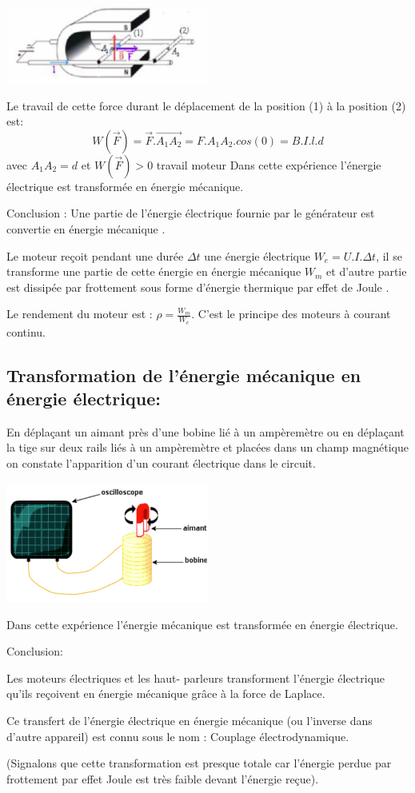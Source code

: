 \documentclass[12pt]{article}
\begin{document}
   \begin{center}
    \includegraphics[width=0.5\textwidth]{./img/rail_laplce.png}
  \end{center}
Le travail de cette force durant le déplacement de la position (1) à la position (2) est:
$$W(\vec{F}) = \vec{F}.\vec{A_1A_2} = F.A_1A_2.cos(0) = B.I.l.d$$ 
avec $A_1A_2 = d$ et $W(\vec{F}) > 0$ travail moteur 
Dans cette expérience l'énergie électrique est transformée en énergie mécanique.

Conclusion : Une partie de l’énergie électrique fournie par le générateur est convertie en énergie mécanique .

Le moteur reçoit pendant une durée $\Delta{t}$ une énergie électrique $W_e = U.I.\Delta{t}$, il se transforme une partie de cette énergie en énergie mécanique $W_m$ et d'autre partie est dissipée par frottement sous forme d'énergie thermique par effet de Joule .

Le rendement du moteur est : $\rho = \frac{W_m}{W_e}$. C’est le principe des moteurs à courant continu.

\subsection{Transformation de l'énergie mécanique en énergie électrique:}
En déplaçant un aimant près d'une bobine lié à un ampèremètre ou en déplaçant la tige sur deux rails liés à un
ampèremètre et placées dans un champ magnétique on constate l'apparition d'un courant électrique dans le circuit.
   \begin{center}
    \includegraphics[width=0.5\textwidth]{./img/app_elec.png}
  \end{center}
Dans cette expérience l'énergie mécanique est transformée en énergie électrique.

Conclusion:

Les moteurs électriques et les haut- parleurs transforment l'énergie électrique qu'ils reçoivent en énergie mécanique
grâce à la force de Laplace.

Ce transfert de l'énergie électrique en énergie mécanique (ou l'inverse dans d'autre appareil) est connu sous le nom : Couplage électrodynamique.

(Signalons que cette transformation est presque totale car l'énergie perdue par frottement par effet Joule est très faible
devant l'énergie reçue).
\end{document}

